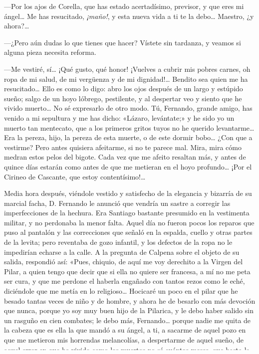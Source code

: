 \documentclass[oneside,14pt,spanish,]{extbook} %
\begin{document}
---Por los ajos de Corella, que has estado acertadísimo, previsor, y que
eres mi ángel\ldots{} Me has resucitado, \emph{¡maño!}, y esta nueva
vida a ti te la debo\ldots{} Maestro, ¿y ahora?\ldots{}

---¿Pero aún dudas lo que tienes que hacer? Vístete sin tardanza, y
veamos si alguna pieza necesita reforma.

---Me vestiré, sí\ldots{} ¡Qué gusto, qué honor! ¡Vuelves a cubrir mis
pobres carnes, oh ropa de mi salud, de mi vergüenza y de mi
dignidad!\ldots{} Bendito sea quien me ha resucitado\ldots{} Ello es
como lo digo: abro los ojos después de un largo y estúpido sueño; salgo
de un hoyo lóbrego, pestilente, y al despertar veo y siento que he
vivido muerto\ldots{} No sé expresarlo de otro modo. Tú, Fernando,
grande amigo, has venido a mi sepultura y me has dicho: «Lázaro,
levántate;» y he sido yo un muerto tan mentecato, que a los primeros
gritos tuyos no he querido levantarme\ldots{} Era la pereza, hijo, la
pereza de esta muerte, o de este dormir bobo\ldots{} ¿Con que a
vestirme? Pero antes quisiera afeitarme, si no te parece mal. Mira, mira
cómo medran estos pelos del bigote. Cada vez que me afeito resaltan más,
y antes de quince días estarán como antes de que me metieran en el hoyo
profundo\ldots{} ¡Por el Cirineo de Cascante, que estoy
contentísimo!\ldots{}

Media hora después, viéndole vestido y satisfecho de la elegancia y
bizarría de su marcial facha, D. Fernando le anunció que vendría un
sastre a corregir las imperfecciones de la hechura. Era Santiago
bastante presumido en la vestimenta militar, y no perdonaba la menor
falta. Aquel día no fueron pocos los reparos que puso al pantalón y las
correcciones que señaló en la espalda, cuello y otras partes de la
levita; pero reventaba de gozo infantil, y los defectos de la ropa no le
impedirían echarse a la calle. A la pregunta de Calpena sobre el objeto
de su salida, respondió así: «Pues, chiquio, de aquí me voy derechito a
la Virgen del Pilar, a quien tengo que decir que si ella no quiere ser
francesa, a mí no me peta ser cura, y que me perdone el haberla engañado
con tantos rezos como le eché, diciéndole que me metía en lo
religioso\ldots{} Hocicaré un poco en el pilar que he besado tantas
veces de niño y de hombre, y ahora he de besarlo con más devoción que
nunca, porque yo soy muy buen hijo de la Pilarica, y le debo haber
salido sin un rasguño en cien combates; le debo más, Fernando\ldots{}
porque nadie me quita de la cabeza que es ella la que mandó a su ángel,
a ti, a sacarme de aquel pozo en que me metieron mis horrendas
melancolías, a despertarme de aquel sueño, de aquel error en que he
vivido como los muertos no sé cuántos meses, que hasta la duración de mi
estúpido letargo se me ha ido de la memoria. Y ya que voy al Pilar, no
saldré de la iglesia \emph{¡maño!} sin arrancarme ante la Señora con un
sin fin de peticiones; gollerías, hijo, que sólo a ella me permito
proponer, pues con Dios no me atrevo\ldots{} francamente. La Virgen sí,
la Virgen no le niega nada a un buen militar español\ldots{} En fin,
allá veremos. Si quieres acompañarme, nos iremos luego al café del Coso.
\end{document}

